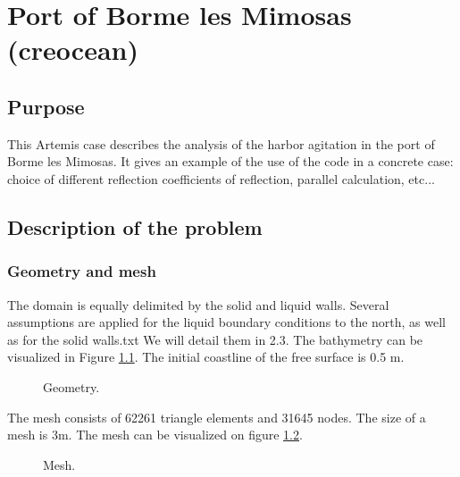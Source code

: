 \chapter{Port of Borme les Mimosas (creocean)}
\section{Purpose}
This Artemis case describes the analysis of the harbor agitation in the port of Borme les Mimosas. It
gives an example of the use of the code in a concrete case: choice of different reflection coefficients
of reflection, parallel calculation, etc...
\section{Description of the problem}
\subsection{Geometry and mesh}
The domain is equally delimited by the solid and liquid walls. Several assumptions
are applied for the liquid boundary conditions to the north, as well as for the solid walls.txt
We will detail them in 2.3. The bathymetry can be visualized in Figure \ref{fig:creocean_bathy}.
The initial coastline of the free surface is 0.5 m.
\begin{figure}[h]
\begin{center}
\end{center}
\caption{Geometry.}
\label{fig:creocean_bathy}
\end{figure}

The mesh consists of 62261 triangle elements and 31645 nodes. The size
of a mesh is 3m. The mesh can be visualized on figure \ref{fig:creocean_mesh}.
\begin{figure}[h]
\begin{center}
\end{center}
\caption{Mesh.}
\label{fig:creocean_mesh}
\end{figure}
